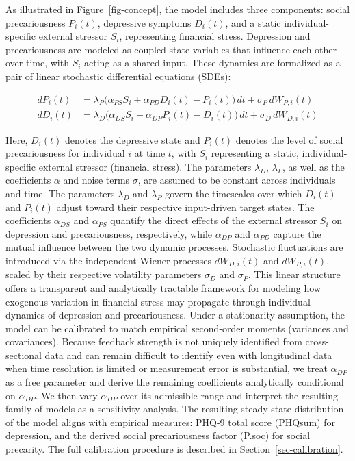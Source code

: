 \documentclass[
]{article}
\begin{document}
As illustrated in Figure~\ref{fig-concept}, the model includes three
components: social precariousness \(P_i(t)\), depressive symptoms
\(D_i(t)\), and a static individual-specific external stressor \(S_i\),
representing financial stress. Depression and precariousness are modeled
as coupled state variables that influence each other over time, with
\(S_i\) acting as a shared input. These dynamics are formalized as a
pair of linear stochastic differential equations (SDEs):

\[
\begin{aligned}
dP_i(t) &= \lambda_P \big( \alpha_{PS} S_i + \alpha_{PD} D_i(t) - P_i(t) \big) \, dt + \sigma_P \, dW_{P,i}(t) \\
dD_i(t) &= \lambda_D \big( \alpha_{DS} S_i + \alpha_{DP} P_i(t) - D_i(t) \big) \, dt + \sigma_D \, dW_{D,i}(t)
\end{aligned}
\]

Here, \(D_i(t)\) denotes the depressive state and \(P_i(t)\) denotes the
level of social precariousness for individual \(i\) at time \(t\), with
\(S_i\) representing a static, individual-specific external stressor
(financial stress). The parameters \(\lambda_D\), \(\lambda_P\), as well
as the coefficients \(\alpha\) and noise terms \(\sigma\), are assumed
to be constant across individuals and time. The parameters \(\lambda_D\)
and \(\lambda_P\) govern the timescales over which \(D_i(t)\) and
\(P_i(t)\) adjust toward their respective input-driven target states.
The coefficients \(\alpha_{DS}\) and \(\alpha_{PS}\) quantify the direct
effects of the external stressor \(S_i\) on depression and
precariousness, respectively, while \(\alpha_{DP}\) and \(\alpha_{PD}\)
capture the mutual influence between the two dynamic processes.
Stochastic fluctuations are introduced via the independent Wiener
processes \(dW_{D,i}(t)\) and \(dW_{P,i}(t)\), scaled by their
respective volatility parameters \(\sigma_D\) and \(\sigma_P\). This
linear structure offers a transparent and analytically tractable
framework for modeling how exogenous variation in financial stress may
propagate through individual dynamics of depression and precariousness.
Under a stationarity assumption, the model can be calibrated to match
empirical second-order moments (variances and covariances). Because
feedback strength is not uniquely identified from cross-sectional data
and can remain difficult to identify even with longitudinal data when
time resolution is limited or measurement error is substantial, we treat
\(\alpha_{DP}\) as a free parameter and derive the remaining
coefficients analytically conditional on \(\alpha_{DP}\). We then vary
\(\alpha_{DP}\) over its admissible range and interpret the resulting
family of models as a sensitivity analysis. The resulting steady-state
distribution of the model aligns with empirical measures: PHQ-9 total
score (PHQsum) for depression, and the derived social precariousness
factor (P.soc) for social precarity. The full calibration procedure is
described in Section~\ref{sec-calibration}.
\end{document}
